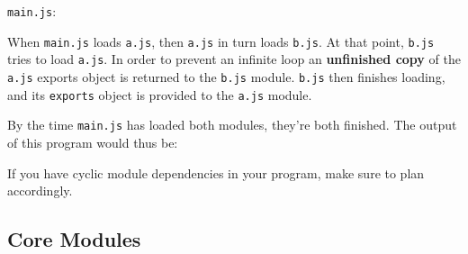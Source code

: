 \texttt{main.js}:

\begin{Shaded}
\end{Shaded}

When \texttt{main.js} loads \texttt{a.js}, then \texttt{a.js} in turn
loads \texttt{b.js}. At that point, \texttt{b.js} tries to load
\texttt{a.js}. In order to prevent an infinite loop an
\textbf{unfinished copy} of the \texttt{a.js} exports object is returned
to the \texttt{b.js} module. \texttt{b.js} then finishes loading, and
its \texttt{exports} object is provided to the \texttt{a.js} module.

By the time \texttt{main.js} has loaded both modules, they're both
finished. The output of this program would thus be:

\begin{Shaded}
\begin{Highlighting}[]
 
  \NormalTok{= }
  \NormalTok{= }
 \NormalTok{=}\NormalTok{, }\NormalTok{=}
\end{Highlighting}
\end{Shaded}

If you have cyclic module dependencies in your program, make sure to
plan accordingly.

\subsection{Core Modules}

